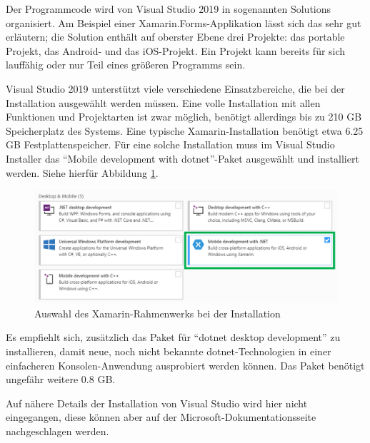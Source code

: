 Der Programmcode wird von Visual Studio 2019 in sogenannten Solutions organisiert.
Am Beispiel einer Xamarin.Forms-Applikation lässt sich das sehr gut erläutern;
die Solution enthält auf oberster Ebene drei Projekte: das portable Projekt, das Android- und das iOS-Projekt.
Ein Projekt kann bereits für sich lauffähig oder nur Teil eines größeren Programms sein.\par

Visual Studio 2019 unterstützt viele verschiedene Einsatzbereiche, die bei der Installation ausgewählt werden müssen.
Eine volle Installation mit allen Funktionen und Projektarten ist zwar möglich, benötigt allerdings bis zu 210 GB Speicherplatz des Systems.
Eine typische Xamarin-Installation benötigt etwa 6.25 GB Festplattenspeicher.
Für eine solche Installation muss im Visual Studio Installer das \enquote{Mobile development with \ac{dotnet}}-Paket ausgewählt und installiert werden. Siehe hierfür Abbildung \ref{fig:auswahl-xamarin}.
\begin{figure}[htbp!]
    \centering\includegraphics[width=0.9\linewidth]{images/auswahl_rahmenwerk/installation.png}    
    \caption{Auswahl des Xamarin-Rahmenwerks bei der Installation}
    \label{fig:auswahl-xamarin}
\end{figure}

Es empfiehlt sich, zusätzlich das Paket für \enquote{\ac{dotnet} desktop development} zu installieren, damit neue, noch nicht bekannte \ac{dotnet}-Technologien in einer einfacheren Konsolen-Anwen\-dung ausprobiert werden können.
Das Paket benötigt ungefähr weitere 0.8 GB.\par
Auf nähere Details der Installation von Visual Studio wird hier nicht eingegangen, diese können aber auf der Microsoft-Dokumentationsseite \cite[vgl.][]{msdoc-vs-install} nachgeschlagen werden.
%
